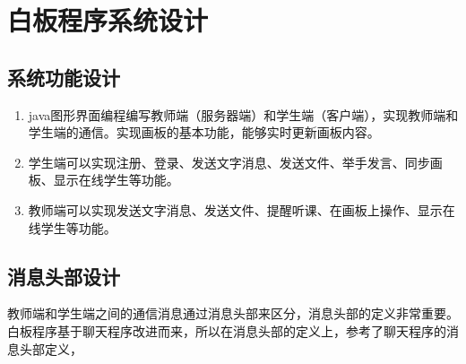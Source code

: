 \documentclass[UTF8,12pt]{article}
\begin{document}
\newpage

\section{白板程序系统设计}
\subsection{系统功能设计}
\begin{enumerate}
    \item java图形界面编程编写教师端（服务器端）和学生端（客户端），实现教师端和学生端的通信。实现画板的基本功能，能够实时更新画板内容。
    \item 学生端可以实现注册、登录、发送文字消息、发送文件、举手发言、同步画板、显示在线学生等功能。
    \item 教师端可以实现发送文字消息、发送文件、提醒听课、在画板上操作、显示在线学生等功能。
\end{enumerate}

\subsection{消息头部设计}
教师端和学生端之间的通信消息通过消息头部来区分，消息头部的定义非常重要。白板程序基于聊天程序改进而来，所以在消息头部的定义上，参考了聊天程序的消息头部定义，
\end{document}
